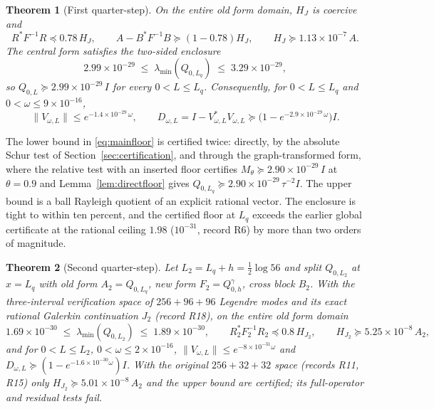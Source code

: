 \documentclass[11pt]{article}
\numberwithin{equation}{section}
\newtheorem{theorem}{Theorem}[section]
\theoremstyle{definition}
\theoremstyle{remark}
\newcommand{\norm}[1]{\lVert#1\rVert}
\newcommand{\Lq}{L_q}
\newcommand{\Ltwo}{L_2}
\newcommand{\FloorAbs}{2.99\times10^{-29}}          %
\newcommand{\ShiftBound}{9\times10^{-16}}           %
\newcommand{\ContractRate}{1.4\times10^{-29}}       %
\newcommand{\DefectRate}{2.9\times10^{-29}}         %
\newcommand{\FloorRelNine}{2.90\times10^{-29}}           %
\newcommand{\ThetaBest}{0.78}                       %
\newcommand{\MuOne}{1.13\times10^{-7}}                         %
\newcommand{\MuTwo}{5.01\times10^{-8}}                         %
\newcommand{\UpperLq}{3.29\times10^{-29}}                     %
\newcommand{\UpperLtwo}{1.89\times10^{-30}}                 %
\newcommand{\FloorTwo}{1.69\times10^{-30}}          %
\newcommand{\ThetaTwo}{0.8}                         %
\newcommand{\MuTwoB}{5.25\times10^{-8}}             %
\newcommand{\ShiftTwo}{2\times10^{-16}}             %
\newcommand{\ContractTwo}{8\times10^{-31}}
\newcommand{\DefectTwo}{1.6\times10^{-30}}
\begin{document}
\begin{theorem}[First quarter-step]\label{thm:main}
On the entire old form domain, $H_J$ is coercive and
\begin{equation}\label{eq:mainrelative}
 R^*F^{-1}R\preceq\ThetaBest\,H_J,\qquad A-B^*F^{-1}B\succeq(1-\ThetaBest)H_J,\qquad H_J\succeq\MuOne\,A .
\end{equation}
The central form satisfies the two-sided enclosure
\begin{equation}\label{eq:mainfloor}
 \FloorAbs\;\le\;\lambda_{\min}(Q_{0,\Lq})\;\le\;\UpperLq ,
\end{equation}
so $Q_{0,L}\succeq\FloorAbs\,I$ for every $0<L\le\Lq$. Consequently, for $0<L\le\Lq$ and $0<\omega\le\ShiftBound$,
\begin{equation}\label{eq:maincontract}
 \norm{V_{\omega,L}}\le e^{-\ContractRate\,\omega},\qquad
 D_{\omega,L}=I-V_{\omega,L}^*V_{\omega,L}\succeq\bigl(1-e^{-\DefectRate\,\omega}\bigr)I .
\end{equation}
\end{theorem}

The lower bound in \eqref{eq:mainfloor} is certified twice: directly, by the absolute Schur test of Section~\ref{sec:certification}, and through the graph-transformed form, where the relative test with an inserted floor certifies $M_\theta\succeq\FloorRelNine\,I$ at $\theta=0.9$ and Lemma~\ref{lem:directfloor} gives $Q_{0,\Lq}\succeq\FloorRelNine\,\tau^{-2}I$. The upper bound is a ball Rayleigh quotient of an explicit rational vector. The enclosure is tight to within ten percent, and the certified floor at $\Lq$ exceeds the earlier global certificate at the rational ceiling $1.98$ ($10^{-31}$, record R6) by more than two orders of magnitude.

\begin{theorem}[Second quarter-step]\label{thm:second}
Let $\Ltwo=\Lq+h=\tfrac12\log56$ and split $Q_{0,\Ltwo}$ at $x=\Lq$ with old form $A_2=Q_{0,\Lq}$, new form $F_2=Q^\gamma_{0,h}$, cross block $B_2$. With the three-interval verification space of $256+96+96$ Legendre modes and its exact rational Galerkin continuation $J_2$ (record R18), on the entire old form domain
\begin{equation}\label{eq:secondfloor}
 \FloorTwo\;\le\;\lambda_{\min}(Q_{0,\Ltwo})\;\le\;\UpperLtwo,\qquad
 R_2^*F_2^{-1}R_2\preceq\ThetaTwo\,H_{J_2},\qquad H_{J_2}\succeq\MuTwoB\,A_2,
\end{equation}
and for $0<L\le\Ltwo$, $0<\omega\le\ShiftTwo$, $\norm{V_{\omega,L}}\le e^{-\ContractTwo\omega}$ and $D_{\omega,L}\succeq(1-e^{-\DefectTwo\omega})I$. With the original $256+32+32$ space (records R11, R15) only $H_{J_2}\succeq\MuTwo\,A_2$ and the upper bound are certified; its full-operator and residual tests fail.
\end{theorem}
\end{document}
